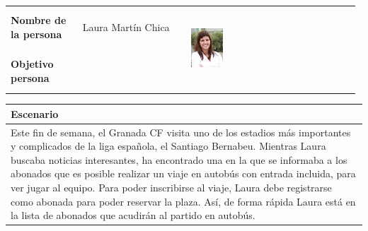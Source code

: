 \documentclass[11pt]{article}
\begin{document}
\begin{table}[H]
  \centering
  \begin{tabular}{p{0.2\linewidth}|p{0.3\linewidth}p{0.475\linewidth}}
    \toprule
    \textbf{Nombre de la persona} & Laura Martín Chica &\multirow{2}{*}{\begin{minipage}{1.\textwidth}\includegraphics[width=0.2\textwidth, height=30mm]{Ana}\end{minipage}}\\
    \textbf{Objetivo persona} &  & \\
    \bottomrule
  \end{tabular}

\begin{tabular}{p{1.028\linewidth}}
  \textbf{Escenario}\\
  \midrule
  Este fin de semana, el Granada CF visita uno de los estadios más importantes y complicados de la liga española, el Santiago Bernabeu. Mientras Laura buscaba noticias interesantes, ha encontrado una en la que se informaba a los abonados que es posible realizar un viaje en autobús con entrada incluida, para ver jugar al equipo. Para poder inscribirse al viaje, Laura debe registrarse como abonada para poder reservar la plaza.
Así, de forma rápida Laura está en la lista de abonados que acudirán al partido en autobús. 
\end{tabular}
\end{table}
\end{document}
